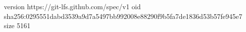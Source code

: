 version https://git-lfs.github.com/spec/v1
oid sha256:0295551dabd3539a9d7a5497bb992008e88290f9b5fa7de1836d53b57fe945e7
size 5161
